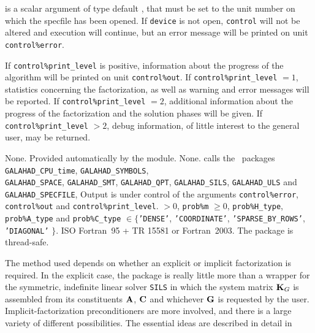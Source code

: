 \documentclass{galahad}
\newcommand{\packagename}{SBLS}
\begin{document}
\begin{description}
 is a scalar \intentin argument of type default \integer,
that must be set to the unit number on which the specfile
has been opened. If {\tt device} is not open, {\tt control} will
not be altered and execution will continue, but an error message
will be printed on unit {\tt control\%error}.

\end{description}


\galinfo
If {\tt control\%print\_level} is positive, information about the progress 
of the algorithm will be printed on unit {\tt control\-\%out}.
If {\tt control\%print\_level} $= 1$, statistics concerning the factorization,
as well as warning and error messages will be reported. 
If {\tt control\%print\_level} $= 2$, additional information about the
progress of the factorization and the solution phases will be given.
If {\tt control\%print\_level} $> 2$, debug information, of little 
interest to the general user, may be returned.


\galgeneral

\galcommon None.
\galworkspace Provided automatically by the module.
\galroutines None. 
\galmodules {\tt \packagename\_solve} calls the \galahad\ packages
{\tt GALAHAD\_CPU\_time},
{\tt GALAHAD\_SY\-M\-BOLS}, \\
{\tt GALAHAD\-\_SPACE},
{\tt GALAHAD\_SMT},
{\tt GALAHAD\_QPT},
{\tt GALAHAD\_SILS},
{\tt GALAHAD\_ULS} and
{\tt GALAHAD\_SPECFILE},
\galio Output is under control of the arguments
 {\tt control\%error}, {\tt control\%out} and {\tt control\%print\_level}.
 $> 0$, {\tt prob\%m} $\geq  0$, 
{\tt prob\%H\_type}, {\tt prob\%A\_type} 
and {\tt prob\%C\_type} $\in \{${\tt 'DENSE'}, 
 {\tt 'COORDINATE'}, {\tt 'SPARSE\_BY\_ROWS'}, {\tt 'DIAGONAL'} $\}$. 
\galportability ISO Fortran~95 + TR 15581 or Fortran~2003. 
The package is thread-safe.


\galmethod
The method used depends on whether an explicit or implicit 
factorization is required. In the explicit case, the 
package is really little more than a wrapper for the
symmetric, indefinite linear solver {\tt SILS} in
which the system matrix ${\mathbf{K}}_G$ is assembled from its constituents
${\mathbf{A}}$, ${\mathbf{C}}$ and whichever ${\mathbf{G}}$ is requested by the user.
Implicit-factorization preconditioners are more involved,
and there is a large variety of different possibilities. The
essential ideas are described in detail in
\vspace*{1mm}
\end{document}
